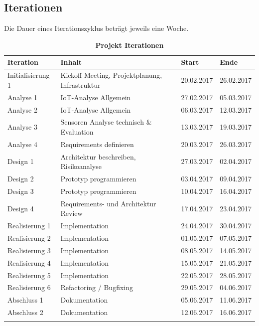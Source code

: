 \subsection{Iterationen}
Die Dauer eines Iterationszyklus beträgt jeweils eine Woche. 
\begin{table}[htb]
\centering
    \begin{tabular}{@{} p{3cm} l l l@{}}\toprule    
    {Iteration} & {Inhalt} & {Start} & {Ende}\\ \midrule
    Initialisierung 1 & Kickoff Meeting, Projektplanung, Infrastruktur & 20.02.2017 & 26.02.2017\\ \addlinespace
    Analyse 1 & IoT-Analyse Allgemein & 27.02.2017 & 05.03.2017\\ \addlinespace
    Analyse 2 & IoT-Analyse Allgemein & 06.03.2017 & 12.03.2017\\ \addlinespace
    Analyse 3 & Sensoren Analyse technisch \& Evaluation & 13.03.2017 & 19.03.2017\\ \addlinespace
    Analyse 4 & Requirements definieren & 20.03.2017 & 26.03.2017\\ \addlinespace
    Design 1 & Architektur beschreiben, Risikoanalyse & 27.03.2017 & 02.04.2017\\ \addlinespace
    Design 2 & Prototyp programmieren & 03.04.2017  & 09.04.2017\\ \addlinespace
    Design 3 & Prototyp programmieren & 10.04.2017  & 16.04.2017\\ \addlinespace
    Design 4 & Requirements- und Architektur Review & 17.04.2017  & 23.04.2017\\ \addlinespace
    Realisierung 1 & Implementation & 24.04.2017  & 30.04.2017\\ \addlinespace
    Realisierung 2 & Implementation & 01.05.2017  & 07.05.2017\\ \addlinespace
    Realisierung 3 & Implementation & 08.05.2017  & 14.05.2017\\ \addlinespace
    Realisierung 4 & Implementation & 15.05.2017  & 21.05.2017\\ \addlinespace
    Realisierung 5 & Implementation & 22.05.2017  & 28.05.2017\\ \addlinespace
    Realisierung 6 & Refactoring / Bugfixing & 29.05.2017  & 04.06.2017\\ \addlinespace
    Abschluss 1 & Dokumentation &  05.06.2017 & 11.06.2017\\ \addlinespace
    Abschluss 2 & Dokumentation &  12.06.2017 & 16.06.2017\\ \addlinespace
    \bottomrule
    \end{tabular}
\caption{\textbf{Projekt Iterationen}}
\end{table}

